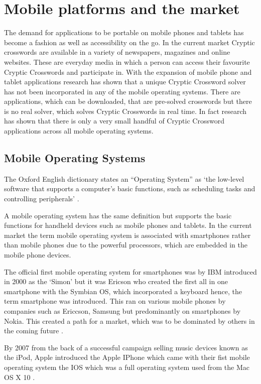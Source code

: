 \section{Mobile platforms and the market}

The demand for applications to be portable on mobile phones and tablets has become a fashion as well as accessibility on the go. In the current market Cryptic crosswords are available in a variety of newspapers, magazines and online websites. These are everyday media in which a person can access their favourite Cryptic Crosswords and participate in. With the expansion of mobile phone and tablet applications research has shown that a unique Cryptic Crossword solver has not been incorporated in any of the mobile operating systems. There are applications, which can be downloaded, that are pre-solved crosswords but there is no real solver, which solves Cryptic Crosswords in real time. In fact research has shown that there is only a very small handful of Cryptic Crossword applications across all mobile operating systems.

\subsection{Mobile Operating Systems}

The Oxford English dictionary states an ``Operating System'' as `the low-level software that supports a computer’s basic functions, such as scheduling tasks and controlling peripherals' \citep{oxford_dictionary11}.

A mobile operating system has the same definition but supports the basic functions for handheld devices such as mobile phones and tablets. In the current market the term mobile operating system is associated with smartphones rather than mobile phones due to the powerful processors, which are embedded in the mobile phone devices. 

The official first mobile operating system for smartphones was by IBM introduced in 2000 as the `Simon' but it was Ericson who created the first all in one smartphone with the Symbian OS, which incorporated a keyboard hence, the term smartphone was introduced. This ran on various mobile phones by companies such as Ericcson, Samsung but predominantly on smartphones by Nokia. This created a path for a market, which was to be dominated by others in the coming future \citep{smartphone11}.

By 2007 from the back of a successful campaign selling music devices known as the iPod, Apple introduced the Apple IPhone which came with their fist mobile operating system the IOS which was a full operating system used from the Mac OS X 10 \citep{macworld07}.

